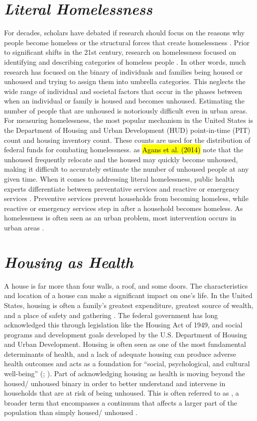 \section{\textit{Literal Homelessness}}
For decades, scholars have debated if research should focus on the reasons why people become homeless or the structural forces that create homelessness \citep{shlay_social_2003}. Prior to significant shifts in the 21st century, research on homelessness focused on identifying and describing categories of homeless people \citep{lee_homelessness_2021}. In other words, much research has focused on the binary of individuals and families being housed or unhoused and trying to assign them into umbrella categories. This neglects the wide range of individual and societal factors that occur in the phases between when an individual or family is housed and becomes unhoused. Estimating the number of people that are unhoused is notoriously difficult even in urban areas. For measuring homelessness, the most popular mechanism in the United States is the Department of Housing and Urban Development (HUD) point-in-time (PIT) count and housing inventory count. These counts are used for the distribution of federal funds for combating homelessness. as \hl{Agans et al. (2014)} note that the unhoused frequently relocate and the housed may quickly become unhoused, making it difficult to accurately estimate the number of unhoused people at any given time. When it comes to addressing literal homelessness, public health experts differentiate between preventative services and reactive or emergency services \citep{oregan_how_2021}. Preventive services prevent households from becoming homeless, while reactive or emergency services step in after a household becomes homeless. As homelessness is often seen as an urban problem, most intervention occurs in urban areas \citep{gleason_using_2021}. 

\section{\textit{Housing as Health}}
A house is far more than four walls, a roof, and some doors. The characteristics and location of a house can make a significant impact on one’s life. In the United States, housing is often a family’s greatest expenditure, greatest source of wealth, and a place of safety and gathering \citep{braveman_housing_2011}. The federal government has long acknowledged this through legislation like the Housing Act of 1949, and social programs and development goals developed by the U.S. Department of Housing and Urban Development. Housing is often seen as one of the most fundamental determinants of health, and a lack of adequate housing can produce adverse health outcomes and acts as a foundation for “social, psychological, and cultural well-being” (\citealp[p.17]{dalessandro_housing_2020}; \citealp{leifheit_building_2022}). Part of acknowledging housing as health is moving beyond the housed/ unhoused binary in order to better understand and intervene in households that are at risk of being unhoused. This is often referred to as \hs, a broader term that encompasses a continuum that affects a larger part of the population than simply housed/ unhoused \citep{deluca_housing_2022}.

